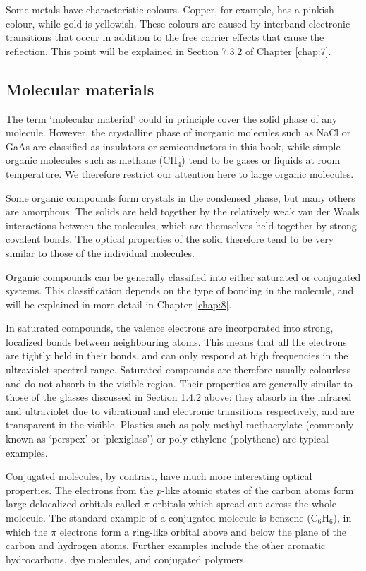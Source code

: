 \documentclass[12pt]{book}
\begin{document}
Some metals have characteristic colours. Copper, for example, has a pinkish colour, while gold is yellowish. These colours are caused by interband electronic transitions that occur in addition to the free carrier effects that cause the reflection. This point will be explained in Section 7.3.2 of Chapter \ref{chap:7}.

\subsection{Molecular materials}

The term `molecular material' could in principle cover the solid phase of any molecule. However, the crystalline phase of inorganic molecules such as NaCl or GaAs are classified as insulators or semiconductors in this book, while simple organic molecules such as methane ($\mathrm{CH_4}$) tend to be gases or liquids at room temperature. We therefore restrict our attention here to large organic molecules.

Some organic compounds form crystals in the condensed phase, but many others are amorphous. The solids are held together by the relatively weak van der Waals interactions between the molecules, which are themselves held together by strong covalent bonds. The optical properties of the solid therefore tend to be very similar to those of the individual molecules.

Organic compounds can be generally classified into either saturated or conjugated systems. This classification depends on the type of bonding in the molecule, and will be explained in more detail in Chapter \ref{chap:8}.

In saturated compounds, the valence electrons are incorporated into strong, localized bonds between neighbouring atoms. This means that all the electrons are tightly held in their bonds, and can only respond at high frequencies in the ultraviolet spectral range. Saturated compounds are therefore usually colourless and do not absorb in the visible region. Their properties are generally similar to those of the glasses discussed in Section 1.4.2 above: they absorb in the infrared and ultraviolet due to vibrational and electronic transitions respectively, and are transparent in the visible. Plastics such as poly-methyl-methacrylate (commonly known as `perspex' or `plexiglass') or poly-ethylene (polythene) are typical examples.

Conjugated molecules, by contrast, have much more interesting optical properties. The electrons from the $p$-like atomic states of the carbon atoms form large delocalized orbitals called $\pi$ orbitals which spread out across the whole molecule. The standard example of a conjugated molecule is benzene ($\mathrm{C_6H_6}$), in which the $\pi$ electrons form a ring-like orbital above and below the plane of the carbon and hydrogen atoms. Further examples include the other aromatic hydrocarbons, dye molecules, and conjugated polymers.
\end{document}
